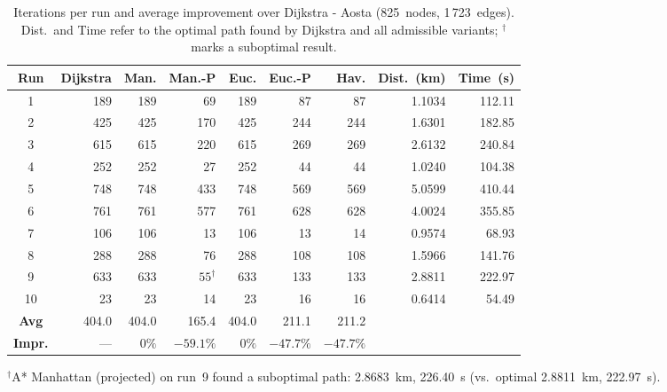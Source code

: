 \documentclass[12pt,a4paper]{article}
\begin{document}
\begin{table}[H]
  \centering
  \small
  \setlength{\tabcolsep}{5pt}
  \begin{tabular}{crrrrrrrr}
    \toprule
    \textbf{Run} & \textbf{Dijkstra} & \textbf{Man.} & \textbf{Man.-P} & \textbf{Euc.} & \textbf{Euc.-P} & \textbf{Hav.} & \textbf{Dist.~(km)} & \textbf{Time~(s)} \\
    \midrule
    1  & 189 & 189 &   69 & 189 &  87 &  87 & 1.1034 & 112.11 \\
    2  & 425 & 425 &  170 & 425 & 244 & 244 & 1.6301 & 182.85 \\
    3  & 615 & 615 &  220 & 615 & 269 & 269 & 2.6132 & 240.84 \\
    4  & 252 & 252 &   27 & 252 &  44 &  44 & 1.0240 & 104.38 \\
    5  & 748 & 748 &  433 & 748 & 569 & 569 & 5.0599 & 410.44 \\
    6  & 761 & 761 &  577 & 761 & 628 & 628 & 4.0024 & 355.85 \\
    7  & 106 & 106 &   13 & 106 &  13 &  14 & 0.9574 &  68.93 \\
    8  & 288 & 288 &   76 & 288 & 108 & 108 & 1.5966 & 141.76 \\
    9  & 633 & 633 & $55^\dagger$ & 633 & 133 & 133 & 2.8811 & 222.97 \\
    10 &  23 &  23 &   14 &  23 &  16 &  16 & 0.6414 &  54.49 \\
    \midrule
    \textbf{Avg}   & 404.0 & 404.0 &  165.4 & 404.0 & 211.1 & 211.2 & & \\
    \textbf{Impr.} & ---   & $0\%$ & $-59.1\%$ & $0\%$ & $-47.7\%$ & $-47.7\%$ & & \\
    \bottomrule
  \end{tabular}
  \vspace{3pt}
  {\footnotesize $^\dagger$A* Manhattan (projected) on run~9 found a suboptimal path: 2.8683~km, 226.40~s (vs.\ optimal 2.8811~km, 222.97~s).}
  \caption{Iterations per run and average improvement over Dijkstra - Aosta (825~nodes, 1\,723~edges). Dist.\ and Time refer to the optimal path found by Dijkstra and all admissible variants; $^\dagger$ marks a suboptimal result.}
  \label{tab:results_aosta}
\end{table}
\end{document}
